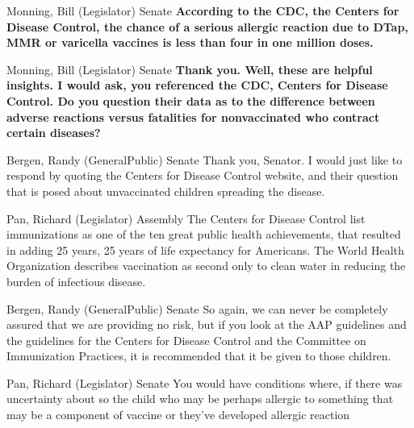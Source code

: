 \begin{result}{36.43010698574717}{Monning, Bill (Legislator) Senate}
\textbf{According to the CDC, the Centers for Disease Control, the chance of a serious allergic reaction due to DTap, MMR or varicella vaccines is less than four in one million doses.
}\end{result}

\begin{result}{18.39225525427141}{Monning, Bill (Legislator) Senate}
\textbf{Thank you. Well, these are helpful insights. I would ask, you referenced the CDC, Centers for Disease Control. Do you question their data as to the difference between adverse reactions versus fatalities for nonvaccinated who contract certain diseases?
}\end{result}

\begin{result}{15.67739188400412}{Bergen, Randy (GeneralPublic) Senate}
Thank you, Senator. I would just like to respond by quoting the Centers for Disease Control website, and their question that is posed about unvaccinated children spreading the disease.
\end{result}

\begin{result}{13.21623776445896}{Pan, Richard (Legislator) Assembly}
The Centers for Disease Control list immunizations as one of the ten great public health achievements, that resulted in adding 25 years, 25 years of life expectancy for Americans. The World Health Organization describes vaccination as second only to clean water in reducing the burden of infectious disease.
\end{result}

\begin{result}{13.085169490229754}{Bergen, Randy (GeneralPublic) Senate}
So again, we can never be completely assured that we are providing no risk, but if you look at the AAP guidelines and the guidelines for the Centers for Disease Control and the Committee on Immunization Practices, it is recommended that it be given to those children.
\end{result}

\begin{result}{12.740299849925432}{Pan, Richard (Legislator) Senate}
You would have conditions where, if there was uncertainty about so the child who may be perhaps allergic to something that may be a component of vaccine or they've developed allergic reaction
\end{result}


